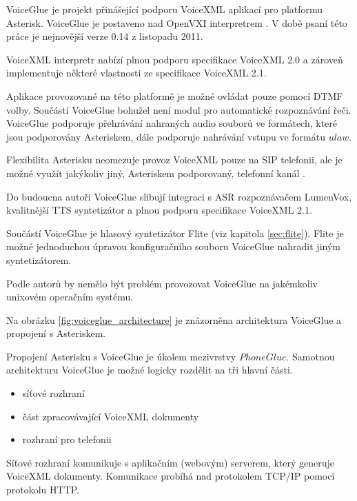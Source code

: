 \documentclass[ing,male,java,dept460]{diploma}						%
\begin{document}
VoiceGlue je projekt přinášející podporu VoiceXML aplikací pro platformu Asterisk. VoiceGlue je postaveno nad OpenVXI interpretrem \cite{voiceglue_org}. V době psaní této práce je nejnovější verze 0.14 z listopadu 2011.

VoiceXML interpretr nabízí plnou podporu specifikace VoiceXML 2.0 a zároveň implementuje některé vlastnosti ze specifikace VoiceXML 2.1.

Aplikace provozované na této platformě je možné ovládat pouze pomocí DTMF volby. Součástí VoiceGlue bohužel není modul pro automatické rozpoznávání řeči. VoiceGlue podporuje přehrávání nahraných audio souborů ve formátech, které jsou podporovány Asteriskem, dále podporuje nahrávání vstupu ve formátu $ulaw$.

Flexibilita Asterisku neomezuje provoz VoiceXML pouze na SIP telefonii, ale je možné využít jakýkoliv jiný, Asteriskem podporovaný, telefonní kanál \cite{voiceglue_architecture}.

Do budoucna autoři VoiceGlue slibují integraci s ASR rozpoznávačem LumenVox, kvalitnější TTS syntetizátor a plnou podporu specifikace VoiceXML 2.1.

Součástí VoiceGlue je hlasový syntetizátor Flite (viz kapitola \ref{sec:flite}). Flite je možné jednoduchou úpravou konfiguračního souboru VoiceGlue nahradit jiným syntetizátorem.

Podle autorů by nemělo být problém provozovat VoiceGlue na jakémkoliv unixovém operačním systému.

Na obrázku \ref{fig:voiceglue_architecture} je znázorněna architektura VoiceGlue a propojení s Asteriskem.


Propojení Asterisku s VoiceGlue je úkolem mezivrstvy $PhoneGlue$. Samotnou architekturu VoiceGlue je možné logicky rozdělit na tři hlavní části.

\begin{itemize}
\item síťové rozhraní
\item část zpracovávající VoiceXML dokumenty
\item rozhraní pro telefonii
\end{itemize}

Síťové rozhraní komunikuje s aplikačním (webovým) serverem, který generuje VoiceXML dokumenty. Komunikace probíhá nad protokolem TCP/IP pomocí protokolu HTTP.
\end{document}
